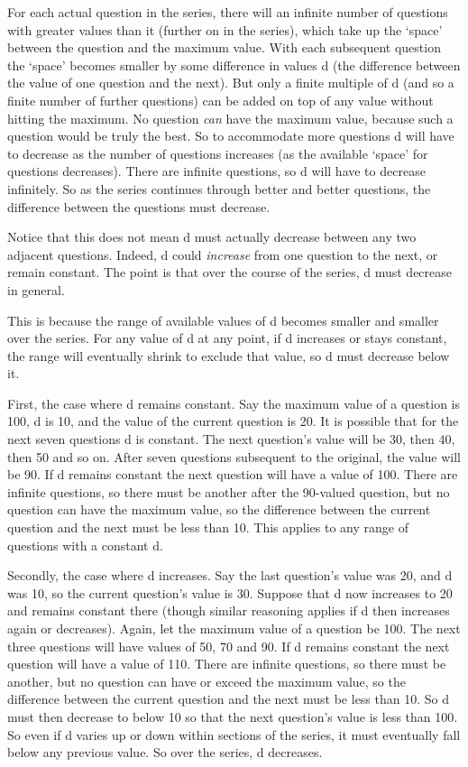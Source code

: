 For each actual question in the series, there will an infinite number of questions with greater values than it (further on in the series), which take up the `space' between the question and the maximum value.
With each subsequent question the `space' becomes smaller by some difference in values d (the difference between the value of one question and the next).
But only a finite multiple of d (and so a finite number of further questions) can be added on top of any value without hitting the maximum.
No question \emph{can} have the maximum value, because such a question would be truly the best.
So to accommodate more questions d will have to decrease as the number of questions increases (as the available `space' for questions decreases).
There are infinite questions, so d will have to decrease infinitely.
So as the series continues through better and better questions, the difference between the questions must decrease.

Notice that this does not mean d must actually decrease between any two adjacent questions.
Indeed, d could \emph{increase} from one question to the next, or remain constant.
The point is that over the course of the series, d must decrease in general.

This is because the range of available values of d becomes smaller and smaller over the series.
For any value of d at any point, if d increases or stays constant, the range will eventually shrink to exclude that value, so d must decrease below it.

First, the case where d remains constant.
Say the maximum value of a question is 100, d is 10, and the value of the current question is 20.
It is possible that for the next seven questions d is constant.
The next question's value will be 30, then 40, then 50 and so on.
After seven questions subsequent to the original, the value will be 90.
If d remains constant the next question will have a value of 100.
There are infinite questions, so there must be another after the 90-valued question, but no question can have the maximum value, so the difference between the current question and the next must be less than 10.
This applies to any range of questions with a constant d.

Secondly, the case where d increases.
Say the last question's value was 20, and d was 10, so the current question's value is 30.
Suppose that d now increases to 20 and remains constant there (though similar reasoning applies if d then increases again or decreases).
Again, let the maximum value of a question be 100.
The next three questions will have values of 50, 70 and 90.
If d remains constant the next question will have a value of 110.
There are infinite questions, so there must be another, but no question can have or exceed the maximum value, so the difference between the current question and the next must be less than 10.
So d must then decrease to below 10 so that the next question's value is less than 100.
So even if d varies up or down within sections of the series, it must eventually fall below any previous value.
So over the series, d decreases.

